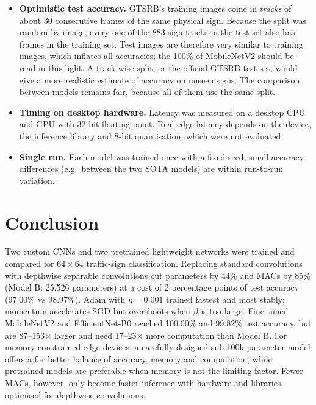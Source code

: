 \documentclass[11pt, a4paper]{article}
\begin{document}
\begin{itemize}
    \item \textbf{Optimistic test accuracy.} GTSRB's training images come in \emph{tracks} of about 30 consecutive
          frames of the same physical sign. Because the split was random by image, every one of the 883 sign tracks in
          the test set also has frames in the training set. Test images are therefore very similar to training images,
          which inflates all accuracies; the 100\% of MobileNetV2 should be read in this light. A track-wise split, or
          the official GTSRB test set, would give a more realistic estimate of accuracy on unseen signs. The comparison
          between models remains fair, because all of them use the same split.
    \item \textbf{Timing on desktop hardware.} Latency was measured on a desktop CPU and GPU with 32-bit floating point.
          Real edge latency depends on the device, the inference library and 8-bit quantisation, which were not
          evaluated.
    \item \textbf{Single run.} Each model was trained once with a fixed seed; small accuracy differences (e.g.\ between
          the two SOTA models) are within run-to-run variation.
\end{itemize}

\section{Conclusion}

Two custom CNNs and two pretrained lightweight networks were trained and compared for $64 \times 64$ traffic-sign
classification. Replacing standard convolutions with depthwise separable convolutions cut parameters by 44\% and MACs
by 85\% (Model B: 25,526 parameters) at a cost of 2 percentage points of test accuracy (97.00\% vs 98.97\%). Adam with
$\eta = 0.001$ trained fastest and most stably; momentum accelerates SGD but overshoots when $\beta$ is too large.
Fine-tuned MobileNetV2 and EfficientNet-B0 reached 100.00\% and 99.82\% test accuracy, but are 87--153$\times$ larger
and need 17--23$\times$ more computation than Model B. For memory-constrained edge devices, a carefully designed
sub-100k-parameter model offers a far better balance of accuracy, memory and computation, while pretrained models
are preferable when memory is not the limiting factor. Fewer MACs, however, only become faster inference with
hardware and libraries optimised for depthwise convolutions.
\end{document}
